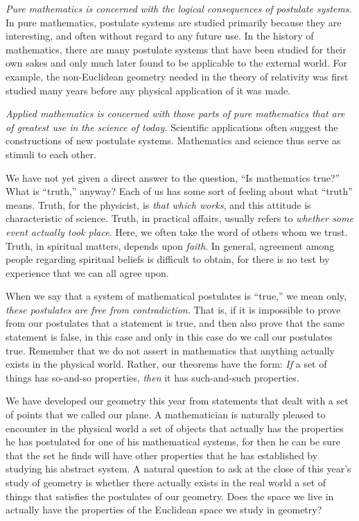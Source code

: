 \documentclass[11pt]{book}
\begin{document}
\emph{Pure mathematics is concerned with the logical consequences of postulate
systems.} In pure mathematics, postulate systems are studied primarily because
they are interesting, and often without regard to any future use. In the
history of mathematics, there are many postulate systems that have been
studied for their own sakes and only much later found to be applicable to the
external world. For example, the non-Euclidean geometry needed in the theory
of relativity was first studied many years before any physical application of
it was made.

\emph{Applied mathematics is concerned with those parts of pure mathematics
that are of greatest use in the science of today.} Scientific applications
often suggest the constructions of new postulate systems. Mathematics and
science thus serve as stimuli to each other.

We have not yet given a direct answer to the question, ``Is mathematics
true?'' What is ``truth,'' anyway? Each of us has some sort of feeling about
what ``truth'' means. Truth, for the physicist, is \emph{that which works},
and this attitude is characteristic of science. Truth, in practical affairs,
usually refers to \emph{whether some event actually took place}. Here, we
often take the word of others whom we trust. Truth, in spiritual matters,
depends upon \emph{faith}. In general, agreement among people regarding
spiritual beliefs is difficult to obtain, for there is no test by experience
that we can all agree upon.

When we say that a system of mathematical postulates is ``true,'' we mean
only, \emph{these postulates are free from contradiction}. That is, if it is
impossible to prove from our postulates that a statement is true, and then
also prove that the same statement is false, in this case and only in this
case do we call our postulates true. Remember that we do not assert in
mathematics that anything actually exists in the physical world. Rather, our
theorems have the form: \emph{If} a set of things has so-and-so properties,
\emph{then} it has such-and-such properties.

We have developed our geometry this year from statements that dealt with a set
of points that we called our plane. A mathematician is naturally pleased to
encounter in the physical world a set of objects that actually has the
properties he has postulated for one of his mathematical systems, for then he
can be sure that the set he finds will have other properties that he has
established by studying his abstract system. A natural question to ask at the
close of this year's study of geometry is whether there actually exists in the
real world a set of things that satisfies the postulates of our geometry. Does
the space we live in actually have the properties of the Euclidean space we
study in geometry?
\end{document}
